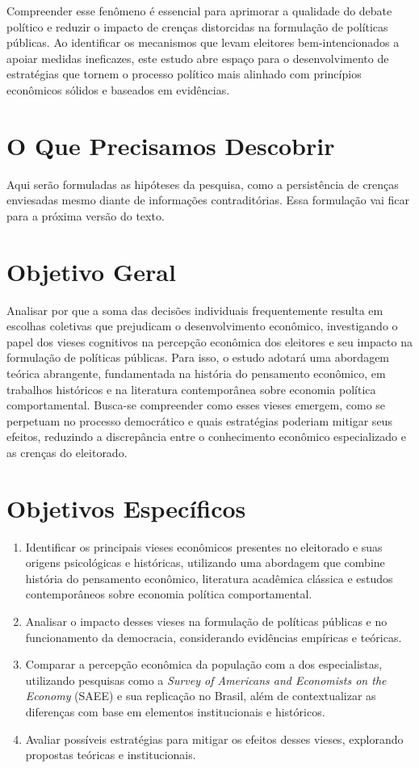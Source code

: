 Compreender esse fenômeno é essencial para aprimorar a qualidade do debate político e reduzir o impacto de crenças distorcidas na formulação de políticas públicas. Ao identificar os mecanismos que levam eleitores bem-intencionados a apoiar medidas ineficazes, este estudo abre espaço para o desenvolvimento de estratégias que tornem o processo político mais alinhado com princípios econômicos sólidos e baseados em evidências.  

\section{O Que Precisamos Descobrir} %

Aqui serão formuladas as hipóteses da pesquisa, como a persistência de crenças enviesadas mesmo diante de informações contraditórias. Essa formulação vai ficar para a próxima versão do texto.

\section{Objetivo Geral}

Analisar por que a soma das decisões individuais frequentemente resulta em escolhas coletivas que prejudicam o desenvolvimento econômico, investigando o papel dos vieses cognitivos na percepção econômica dos eleitores e seu impacto na formulação de políticas públicas. Para isso, o estudo adotará uma abordagem teórica abrangente, fundamentada na história do pensamento econômico, em trabalhos históricos e na literatura contemporânea sobre economia política comportamental. Busca-se compreender como esses vieses emergem, como se perpetuam no processo democrático e quais estratégias poderiam mitigar seus efeitos, reduzindo a discrepância entre o conhecimento econômico especializado e as crenças do eleitorado.

\section{Objetivos Específicos}

\begin{enumerate}[label=\alph*)]
    \item Identificar os principais vieses econômicos presentes no eleitorado e suas origens psicológicas e históricas, utilizando uma abordagem que combine história do pensamento econômico, literatura acadêmica clássica e estudos contemporâneos sobre economia política comportamental.
    \item Analisar o impacto desses vieses na formulação de políticas públicas e no funcionamento da democracia, considerando evidências empíricas e teóricas.
    \item Comparar a percepção econômica da população com a dos especialistas, utilizando pesquisas como a \textit{Survey of Americans and Economists on the Economy} (SAEE) e sua replicação no Brasil, além de contextualizar as diferenças com base em elementos institucionais e históricos.
    \item Avaliar possíveis estratégias para mitigar os efeitos desses vieses, explorando propostas teóricas e institucionais.
\end{enumerate}

